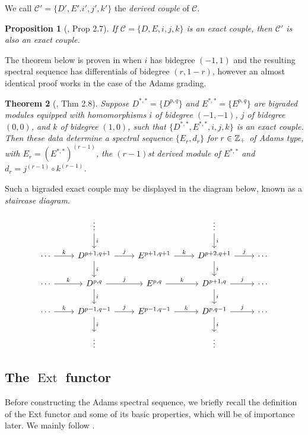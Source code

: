 \documentclass[11pt, titlepage]{article} %
\def\inte{\ensuremath\mathbb{Z}}
\DeclareMathOperator{\Ext}{Ext}
\numberwithin{equation}{subsection}
\theoremstyle{plain}
\newtheorem{theorem}{Theorem}[subsection]
\newtheorem{proposition}[theorem]{Proposition}
\theoremstyle{definition}
\begin{document}
We call \(\mathcal{C}'=\{D', E'. i', j', k'\}\) the \textit{derived couple} of \(\mathcal{C}\). 

\begin{proposition}[\autocite{spectral_sequences}, Prop 2.7]
If \(\mathcal{C}=\{D, E, i, j, k\}\) is an exact couple, then \(\mathcal{C}'\) is also an exact couple.
\end{proposition}

The theorem below is proven in \autocite{spectral_sequences} when \(i\) has bidegree \((-1, 1)\) and the resulting spectral sequence has differentials of bidegree \((r, 1-r)\), however an almost identical proof works in the case of the Adams grading. 

\begin{theorem}[{\autocite{spectral_sequences}, Thm 2.8}]\label{2503301131}
Suppose \(D^{*,*}=\{D^{p,q}\}\) and \(E^{*,*}=\{E^{p,q}\}\) are bigraded modules equipped with homomorphisms \(i\) of bidegree \((-1,-1)\), \(j\) of bidegree \((0,0)\), and \(k\) of bidegree \((1,0)\), such that \(\{D^{*,*}, E^{*,*}, i, j, k\}\) is an exact couple. Then these data determine a spectral sequence \(\{E_r, d_r\}\) for \(r\in \inte_+\) of Adams type, with \(E_r=(E^{*,*})^{(r-1)}\), the \((r-1)\)st derived module of \(E^{*,*}\) and \(d_r=j^{(r-1)}\circ k^{(r-1)}\).
\end{theorem}

Such a bigraded exact couple may be displayed in the diagram below, known as a \textit{staircase diagram}.

\[\begin{tikzcd} 
   &  \vdots \arrow[d, "i"] &  & \vdots \arrow[d, "i"] & \\
 \cdots \arrow[r, "k"] & D^{p+1, q+1} \arrow[d, "i"] \arrow[r, "j"] & E^{p+1,q+1}  \arrow[r, "k"] & D^{p+2,q+1} \arrow[d, "i"] \arrow[r, "j"] & \cdots \\
 \cdots \arrow[r, "k"] & D^{p,q} \arrow[d, "i"] \arrow[r, "j"] & E^{p,q}  \arrow[r, "k"] & D^{p+1,q} \arrow[d, "i"] \arrow[r, "j"] & \cdots \\
 \cdots \arrow[r, "k"] & D^{p-1,q-1}  \arrow[d, "i"] \arrow[r, "j"] & E^{p-1,q-1}  \arrow[r, "k"] & D^{p,q-1} \arrow[d, "i"] \arrow[r, "j"] & \cdots \\
 & \vdots &  & \vdots & 
\end{tikzcd}\]

\subsection{The \(\Ext\) functor}\label{2504291247}
Before constructing the Adams spectral sequence, we briefly recall the definition of the Ext functor and some of its basic properties, which will be of importance later. We mainly follow \autocite{weibel}.
\end{document}

